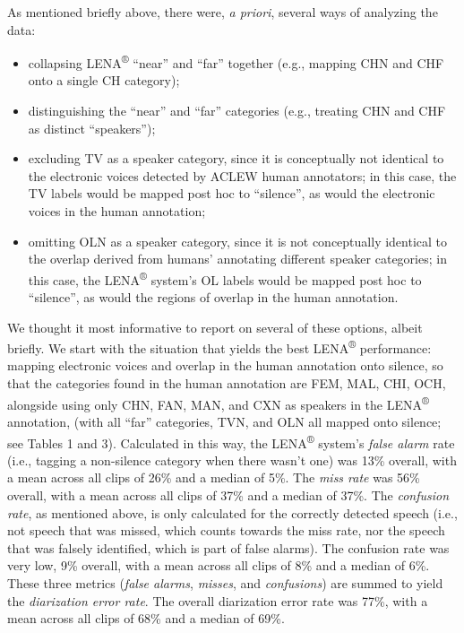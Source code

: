 \documentclass[english,floatsintext,man]{apa6}
\providecommand{\tightlist}{%
  \setlength{\itemsep}{0pt}\setlength{\parskip}{0pt}}
\begin{document}
As mentioned briefly above, there were, \emph{a priori}, several ways of
analyzing the data:

\begin{itemize}
\tightlist
\item
  collapsing LENA\textsuperscript{®} \enquote{near} and \enquote{far}
  together (e.g., mapping CHN and CHF onto a single CH category);
\item
  distinguishing the \enquote{near} and \enquote{far} categories (e.g.,
  treating CHN and CHF as distinct \enquote{speakers});
\item
  excluding TV as a speaker category, since it is conceptually not
  identical to the electronic voices detected by ACLEW human annotators;
  in this case, the TV labels would be mapped post hoc to
  \enquote{silence}, as would the electronic voices in the human
  annotation;
\item
  omitting OLN as a speaker category, since it is not conceptually
  identical to the overlap derived from humans' annotating different
  speaker categories; in this case, the LENA\textsuperscript{®} system's
  OL labels would be mapped post hoc to \enquote{silence}, as would the
  regions of overlap in the human annotation.
\end{itemize}

We thought it most informative to report on several of these options,
albeit briefly. We start with the situation that yields the best
LENA\textsuperscript{®} performance: mapping electronic voices and
overlap in the human annotation onto silence, so that the categories
found in the human annotation are FEM, MAL, CHI, OCH, alongside using
only CHN, FAN, MAN, and CXN as speakers in the LENA\textsuperscript{®}
annotation, (with all \enquote{far} categories, TVN, and OLN all mapped
onto silence; see Tables 1 and 3). Calculated in this way, the
LENA\textsuperscript{®} system's \emph{false alarm} rate (i.e., tagging
a non-silence category when there wasn't one) was 13\% overall, with a
mean across all clips of 26\% and a median of 5\%. The \emph{miss rate}
was 56\% overall, with a mean across all clips of 37\% and a median of
37\%. The \emph{confusion rate}, as mentioned above, is only calculated
for the correctly detected speech (i.e., not speech that was missed,
which counts towards the miss rate, nor the speech that was falsely
identified, which is part of false alarms). The confusion rate was very
low, 9\% overall, with a mean across all clips of 8\% and a median of
6\%. These three metrics (\emph{false alarms}, \emph{misses}, and
\emph{confusions}) are summed to yield the \emph{diarization error
rate}. The overall diarization error rate was 77\%, with a mean across
all clips of 68\% and a median of 69\%.
\end{document}
